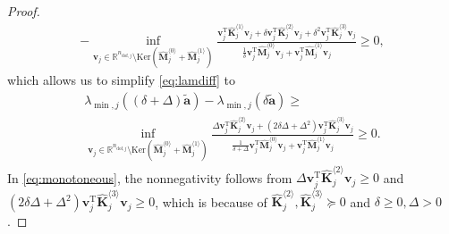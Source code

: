 \documentclass[final,onefignum,onetabnum]{siamart220329}
\newtheorem*{proof}{Proof}%
\begin{document}
\begin{proposition}
\begin{proof}
\begin{multline}
	- \inf_{\mathbf{v}_j \in \mathbb{R}^{n_{\mathrm{dof},j}}\setminus \mathrm{Ker}\left(\hat{\mathbf{M}}_j^{\langle 0\rangle}+\hat{\mathbf{M}}_j^{\langle 1\rangle}\right)} \frac{\mathbf{v}_j^\mathrm{T} \hat{\mathbf{K}}_j^{\langle 1\rangle}\mathbf{v}_j + \delta \mathbf{v}_j^\mathrm{T}\hat{\mathbf{K}}_j^{\langle 2\rangle} \mathbf{v}_j + \delta^2 \mathbf{v}_j^\mathrm{T}\hat{\mathbf{K}}_j^{\langle 3\rangle} \mathbf{v}_j}{\frac{1}{\delta}\mathbf{v}_j^\mathrm{T} \hat{\mathbf{M}}_j^{\langle 0\rangle} \mathbf{v}_j + \mathbf{v}_j^\mathrm{T} \hat{\mathbf{M}}_j^{\langle 1\rangle} \mathbf{v}_j} \ge 0,
\end{multline}
%
which allows us to simplify \eqref{eq:lamdiff} to
%
\begin{equation}\label{eq:monotoneous}
\begin{multlined}
\lambda_{\min,j}((\delta + \Delta)\tilde{\mathbf{a}}) - \lambda_{\min,j}(\delta \tilde{\mathbf{a}}) \ge\\
 \inf_{\mathbf{v}_j \in \mathbb{R}^{n_{\mathrm{dof},j}}\setminus \mathrm{Ker}\left(\hat{\mathbf{M}}_j^{\langle 0\rangle}+\hat{\mathbf{M}}_j^{\langle 1\rangle}\right)} 
\frac{\Delta \mathbf{v}_j^\mathrm{T}\hat{\mathbf{K}}_j^{\langle 2\rangle} \mathbf{v}_j + (2\delta \Delta + \Delta^2) \mathbf{v}_j^\mathrm{T}\hat{\mathbf{K}}_j^{\langle 3\rangle} \mathbf{v}_j}{\frac{1}{\delta + \Delta}\mathbf{v}_j^\mathrm{T} \hat{\mathbf{M}}_j^{\langle 0\rangle} \mathbf{v}_j + \mathbf{v}_j^\mathrm{T} \hat{\mathbf{M}}_j^{\langle 1\rangle} \mathbf{v}_j} \ge 0.
\end{multlined}
\end{equation}
%
In \eqref{eq:monotoneous}, the nonnegativity follows from $\Delta \mathbf{v}_j^\mathrm{T}\hat{\mathbf{K}}_j^{\langle 2\rangle} \mathbf{v}_j \ge 0$ and $\left(2\delta \Delta + \Delta^2\right) \mathbf{v}_j^\mathrm{T}\hat{\mathbf{K}}_j^{\langle 3\rangle} \mathbf{v}_j\ge 0$, which is because of $\hat{\mathbf{K}}_j^{\langle 2\rangle}, \hat{\mathbf{K}}_j^{\langle 3\rangle} \succeq 0$ and $\delta\ge 0, \Delta > 0$.
\end{proof}
\end{proposition}
\end{document}
